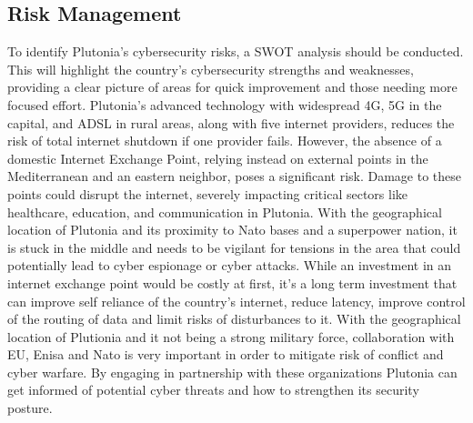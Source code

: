 \documentclass[
	a4paper, %
	10pt, %
]{CSSullivanBusinessReport}
\begin{document}
\begin{fullwidth}
\begin{justify}
\section{Risk Management}
To identify Plutonia's cybersecurity risks, a SWOT analysis should be conducted. This will highlight the country's cybersecurity strengths and weaknesses, providing a clear picture of areas for quick improvement and those needing more focused effort. Plutonia's advanced technology with widespread 4G, 5G in the capital, and ADSL in rural areas, along with five internet providers, reduces the risk of total internet shutdown if one provider fails. However, the absence of a domestic Internet Exchange Point, relying instead on external points in the Mediterranean and an eastern neighbor, poses a significant risk. Damage to these points could disrupt the internet, severely impacting critical sectors like healthcare, education, and communication in Plutonia. With the geographical location of Plutonia and its proximity to Nato bases and a superpower nation, it is stuck in the middle and needs to be vigilant for tensions in the area that could potentially lead to cyber espionage or cyber attacks. While an investment in an internet exchange point would be costly at first, it's a long term investment that can improve self reliance of the country's internet, reduce latency, improve control of the routing of data and limit risks of disturbances to it. With the geographical location of Plutionia and it not being a strong military force, collaboration with EU, Enisa and Nato is very important in order to mitigate risk of conflict and cyber warfare. By engaging in partnership with these organizations Plutonia can get informed of potential cyber threats and how to strengthen its security posture. 


\end{justify}
\end{fullwidth}
\end{document}
